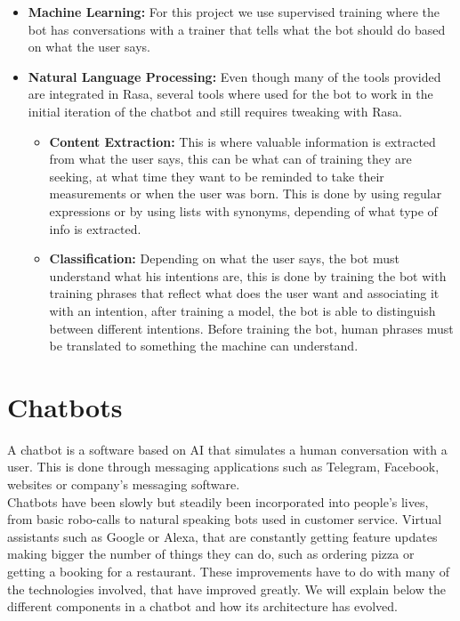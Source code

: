 \begin{itemize}
	\item {\textbf{Machine Learning:} For this project we use supervised training where the bot has conversations with a trainer that tells what the bot should do based on what the user says.}
	\item {\textbf{Natural Language Processing:} Even though many of the tools provided are integrated in Rasa, several tools where used for the bot to work in the initial iteration of the chatbot and still requires tweaking with Rasa.\\
		
		\begin{itemize}
			\item {\textbf{Content Extraction:} This is where valuable information is extracted from what the user says, this can be what can of training they are seeking, at what time they want to be reminded to take their measurements or when the user was born. This is done by using regular expressions or by using lists with synonyms, depending of what type of info is extracted.}
			\item {\textbf{Classification:} Depending on what the user says, the bot must understand what his intentions are, this is done by training the bot with training phrases that reflect what does the user want and associating it with an intention, after training a model, the bot is able to distinguish between different intentions. Before training the bot, human phrases must be translated to something the machine can understand.}
		\end{itemize}
			}
\end{itemize}


\section{Chatbots}\label{sec:chap3_ai}
A chatbot is a software based on AI that simulates a human conversation with a user. This is done through messaging applications such as Telegram, Facebook, websites or company’s messaging software.\\

Chatbots have been slowly but steadily been incorporated into people’s lives, from basic robo-calls to natural speaking bots used in customer service. Virtual assistants such as Google or Alexa, that are constantly getting feature updates making bigger the number of things they can do, such as ordering pizza or getting a booking for a restaurant. These improvements have to do with many of the technologies involved, that have improved greatly. We will explain below the different components in a chatbot and how its architecture has evolved.\\

